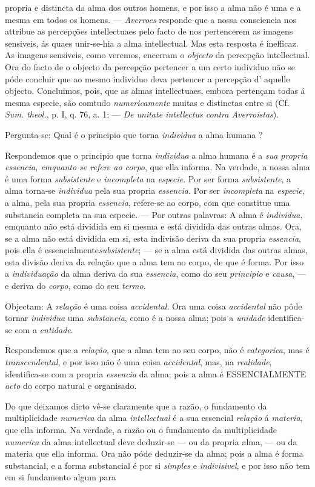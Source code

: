 propria e distincta da alma dos outros homens, e por isso a alma não é uma e a mesma em todos os homens. --- \emph{Averroes} responde que a nossa consciencia nos attribue as percepções intellectuaes pelo facto de nos pertencerem as imagens sensiveis, ás quaes unir-se-hia a alma intellectual. Mas esta resposta é inefficaz. As imagens sensiveis, como veremos, encerram o \emph{objecto} da percepção intellectual. Ora do facto de o objecto da percepção pertencer a um certo individuo não se póde concluir que ao mesmo individuo deva pertencer a percepção d' aquelle objecto. Concluimos, pois, que as almas intellectuaes, embora pertençam todas á mesma especie, são comtudo \emph{numericamente} muitas e distinctas entre si (Cf. \emph{Sum. theol.}, p. I, q. 76, a. 1; --- \emph{De unitate intellectus contra Averroistas}).\par *\par Pergunta-se: Qual é o principio que torna \emph{individua} a alma humana ?\par Respondemos que o principio que torna \emph{individua} a alma humana é a \emph{sua propria essencia, emquanto se refere ao corpo}, que ella informa. Na verdade, a nossa alma é uma forma \emph{subsistente} e \emph{incompleta} na \emph{especie}. Por ser forma \emph{subsistente}, a alma torna-se \emph{individua} pela sua propria \emph{essencia}. Por ser \emph{incompleta} na \emph{especie}, a alma, pela sua propria \emph{essencia}, refere-se ao corpo, com que constitue uma substancia completa na sua especie. --- Por outras palavras: A alma é \emph{individua}, emquanto não está dividida em si mesma e está dividida das outras almas. Ora, se a alma não está dividida em si, esta indivisão deriva da sua propria \emph{essencia}, pois ella é essencialmente\emph{subsistente}; --- se a alma está dividida das outras almas, esta divisão deriva da relação que a alma tem ao corpo, de que é forma. Por isso a \emph{individuação} da alma deriva da sua \emph{essencia}, como do seu \emph{principio} e \emph{causa}, --- e deriva do \emph{corpo}, como do seu \emph{termo}.\par Objectam: A \emph{relação} é uma coisa \emph{accidental}. Ora uma coisa \emph{accidental} não pôde tornar \emph{individua} uma \emph{substancia}, como é a nossa alma; pois a \emph{unidade} identifica-se com a \emph{entidade}.\par Respondemos que a \emph{relação}, que a alma tem ao seu corpo, não é \emph{categorica}, mas é \emph{transcendental}, e por isso não é uma coisa \emph{accidental}, mas, na \emph{realidade}, identifica-se com a propria \emph{essencia} da alma; pois a alma é \textsc{ESSENCIALMENTE} \emph{acto} do corpo natural e organisado.\par Do que deixamos dicto vê-se claramente que a razão, o fundamento da multiplicidade \emph{numerica} da alma \emph{intellectual} é a sua essencial \emph{relação} á \emph{materia}, que ella informa. Na verdade, a razão ou o fundamento da multiplicidade \emph{numerica} da alma intellectual deve deduzir-se --- ou da propria alma, --- ou da materia que ella informa. Ora não póde deduzir-se da alma; pois a alma é forma substancial, e a forma substancial é por si \emph{simples} e \emph{indivisivel}, e por isso não tem em si fundamento algum para 